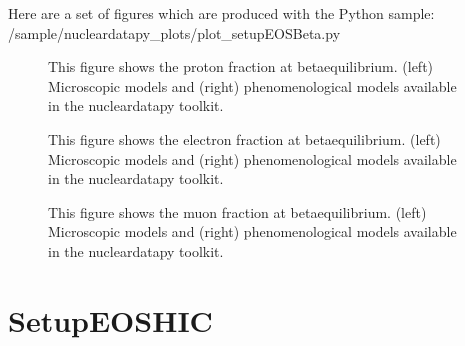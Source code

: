 \documentclass[letterpaper,10pt,english]{sphinxmanual}
\begin{document}
\sphinxAtStartPar
Here are a set of figures which are produced with the Python sample: /sample/nucleardatapy\_plots/plot\_setupEOSBeta.py

\begin{figure}[htbp]
\centering
\capstart

\noindent{}
\caption{This figure shows the proton fraction at beta\sphinxhyphen{}equilibrium. (left) Microscopic models and (right) phenomenological models available in the nucleardatapy toolkit.}\label{\detokenize{source/api/setup_eos_beta:id1}}\end{figure}

\begin{figure}[htbp]
\centering
\capstart

\noindent{}
\caption{This figure shows the electron fraction at beta\sphinxhyphen{}equilibrium. (left) Microscopic models and (right) phenomenological models available in the nucleardatapy toolkit.}\label{\detokenize{source/api/setup_eos_beta:id2}}\end{figure}

\begin{figure}[htbp]
\centering
\capstart

\noindent{}
\caption{This figure shows the muon fraction at beta\sphinxhyphen{}equilibrium. (left) Microscopic models and (right) phenomenological models available in the nucleardatapy toolkit.}\label{\detokenize{source/api/setup_eos_beta:id3}}\end{figure}

\sphinxstepscope


\section{SetupEOSHIC}
\label{\detokenize{source/api/setup_eos_hic:setupeoshic}}\label{\detokenize{source/api/setup_eos_hic::doc}}\label{\detokenize{source/api/setup_eos_hic:module-nucleardatapy.setup_eos_hic}}
\end{document}
